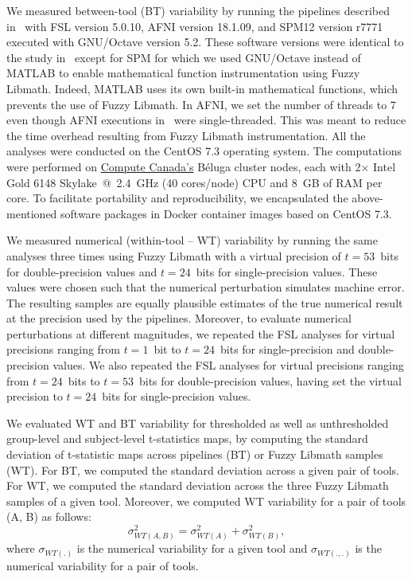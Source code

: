 \documentclass[11pt,onecolumn]{article}
\begin{document}
We measured between-tool (BT) variability by running the pipelines
described in~\cite{bowring2019exploring} with FSL version 5.0.10, AFNI
version 18.1.09, and SPM12 version r7771 executed with GNU/Octave version
5.2. These software versions were identical to the study
in~\cite{bowring2019exploring} except for SPM for which we used GNU/Octave
instead of MATLAB to enable mathematical function instrumentation using
Fuzzy Libmath. Indeed, MATLAB uses its own built-in mathematical functions,
which prevents the use of Fuzzy Libmath. In AFNI, we set the number of
threads to 7 even though AFNI executions
in~\cite{bowring2019exploring} were single-threaded. This was meant to
reduce the time overhead resulting from Fuzzy Libmath instrumentation. All
the analyses were conducted on the CentOS 7.3 operating system. The
computations were performed on \href{https://www.computecanada.ca}{Compute
Canada's} Béluga cluster nodes, each with 2$\times$ Intel Gold 6148 Skylake~@~2.4~GHz
 (40 cores/node) CPU and 8~GB of RAM per core. To facilitate portability and reproducibility,
 we encapsulated the
above-mentioned software packages in Docker container images based on CentOS 7.3.

We measured numerical (within-tool -- WT) variability by running the same analyses three
times using Fuzzy Libmath with a virtual precision of $t=53$~bits for
double-precision values and $t=24$~bits for single-precision values. These
values were chosen such that the numerical perturbation simulates machine
error. The resulting samples are equally plausible estimates of
the true numerical result at the precision used by the pipelines. Moreover, to evaluate numerical perturbations at different magnitudes, 
we repeated the FSL analyses for virtual
precisions ranging from $t=1$~bit to $t=24$~bits for single-precision
and double-precision values. We also repeated the FSL analyses for virtual 
precisions ranging from $t=24$~bits to $t=53$~bits for double-precision values, having 
set the virtual precision to $t=24$~bits for single-precision values. 

We evaluated WT and BT variability for thresholded as well as unthresholded
group-level and subject-level t-statistics maps, by computing the
standard deviation of t-statistic maps across pipelines (BT) or Fuzzy Libmath samples (WT). For BT, we computed the standard deviation 
across a given pair of tools.
For WT, we computed the standard deviation across the three
Fuzzy Libmath samples of a given tool. Moreover, we computed WT variability for a pair of tools (A, B) as follows:
\begin{equation}
  \sigma_{WT(A,B)}^2 = \sigma_{WT(A)}^2 + \sigma_{WT(B)}^2,
  \label{eq:wt-pair}
\end{equation}
where $\sigma_{WT(.)}$ is the numerical variability for a given tool
and $\sigma_{WT(., .)}$ is the numerical variability for a pair of tools.
\end{document}

